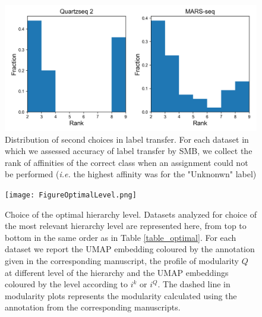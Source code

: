 \documentclass[11pt, titlepage, twoside]{article}
\begin{document}
\begin{figure}[htbp]
\centering
\includegraphics[keepaspectratio,width=\textwidth,height=0.75\textheight]{hist_label_second.png}
\caption[]{Distribution of second choices in label transfer. For each dataset in which we assessed accuracy of label transfer by SMB, we collect the rank of affinities of the correct class when an assignment could not be performed (\emph{i.e.} the highest affinity was for the "Unknonwn" label)  }\label{hist_label_second}
\end{figure}
\clearpage

\begin{figure}[htbp]
\centering
\texttt{[image: FigureOptimalLevel.png]}
\caption[]{Choice of the optimal hierarchy level. Datasets analyzed for choice of the most relevant hierarchy level are represented here, from top to bottom in the same order as in Table \ref{table_optimal}. For each dataset we report the UMAP embedding coloured by the annotation given in the corresponding manuscript, the profile of modularity $Q$ at different level of the hierarchy and the UMAP embeddings coloured by the level according to $i^k$ or $i^Q$. The dashed line in modularity plots represents the modularity calculated using the annotation from the corresponding manuscripts.}\label{FigureOptimalLevel}
\end{figure}
\end{document}
